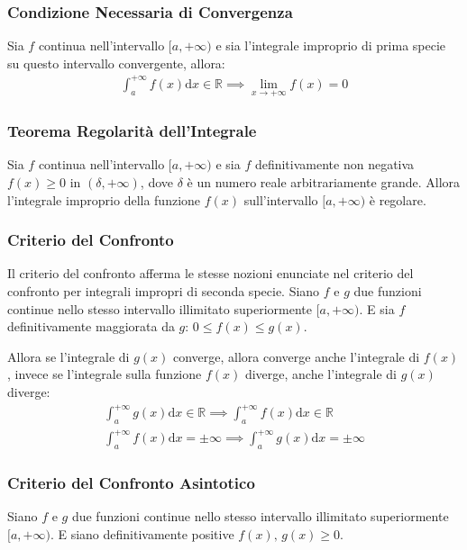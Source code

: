 \documentclass{article}
\newcommand{\df}{\mathrm{d}}
\numberwithin{equation}{subsection}
\begin{document}
\subsubsection{Condizione Necessaria di Convergenza}

Sia $f$ continua nell'intervallo $[a,+\infty)$ e sia l'integrale improprio di prima specie su questo intervallo convergente, allora:
\begin{gather}
    \int_a^{+\infty}f(x)\df x\in\mathbb{R}\implies\lim_{x\to+\infty}f(x)=0
\end{gather}

\subsubsection{Teorema Regolarità dell'Integrale}

Sia $f$ continua nell'intervallo $[a,+\infty)$ e sia $f$ definitivamente non negativa $f(x)\geq0$ in $(\delta, +\infty)$, dove $\delta$ è un numero reale arbitrariamente grande. 
Allora l'integrale improprio della funzione $f(x)$ sull'intervallo $[a,+\infty)$ è regolare. 

\subsubsection{Criterio del Confronto}

Il criterio del confronto afferma le stesse nozioni enunciate nel criterio del confronto per integrali impropri di seconda specie. 
Siano $f$ e $g$ due funzioni continue nello stesso intervallo illimitato superiormente $[a,+\infty)$. E sia $f$ definitivamente maggiorata da $g$: $0\leq f(x)\leq g(x)$. 

Allora se l'integrale di $g(x)$ converge, allora converge anche l'integrale di $f(x)$, invece se l'integrale sulla funzione $f(x)$ diverge, anche l'integrale di $g(x)$ diverge:
\begin{gather}
    \int_a^{+\infty}g(x)\df x\in\mathbb{R}\implies\int_a^{+\infty}f(x)\df x\in\mathbb{R}\\
    \int_a^{+\infty}f(x)\df x=\pm\infty\implies\int_a^{+\infty}g(x)\df x=\pm\infty
\end{gather}

\subsubsection{Criterio del Confronto Asintotico}

Siano $f$ e $g$ due funzioni continue nello stesso intervallo illimitato superiormente $[a,+\infty)$. E siano definitivamente positive $f(x),\,g(x)\geq0$.
\end{document}
